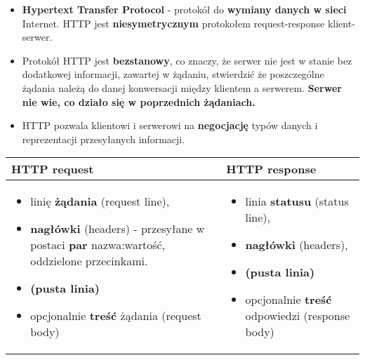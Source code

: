 \documentclass[../main.tex]{subfiles}
\begin{document}
    \begin{itemize}
        \item \textbf{Hypertext Transfer Protocol} - protokół do \textbf{wymiany danych w sieci} Internet. HTTP jest \textbf{niesymetrycznym} protokołem request-response klient-serwer.
        \item Protokół HTTP jest \textbf{bezstanowy}, co znaczy, że serwer nie jest w stanie bez dodatkowej informacji, zawartej w żądaniu, stwierdzić że poszczególne żądania należą do danej konwersacji między klientem a serwerem. \textbf{Serwer nie wie, co działo się w poprzednich żądaniach.}
        \item HTTP pozwala klientowi i serwerowi na \textbf{negocjację} typów danych i reprezentacji przesyłanych informacji.
    \end{itemize}

    \begin{table}[H]
        \begin{center}
            \begin{tabular}{|p{8cm}|p{8cm}|}
                \hline
                \textbf{HTTP request} & \textbf{HTTP response}\\
                \hline
                \hline
                \begin{itemize}
                    \item linię \textbf{żądania} (request line),
                    \item \textbf{nagłówki} (headers) - przesyłane w postaci \textbf{par} nazwa:wartość, oddzielone przecinkami.
                    \item \textbf{(pusta linia)}
                    \item opcjonalnie \textbf{treść} żądania (request body)
                \end{itemize}
                &
                \begin{itemize}
                    \item linia \textbf{statusu} (status line),
                    \item \textbf{nagłówki} (headers),
                    \item \textbf{(pusta linia)}
                    \item opcjonalnie \textbf{treść} odpowiedzi (response body)
                \end{itemize}\\
                \hline
            \end{tabular}
        \end{center}
    \end{table}
\end{document}
